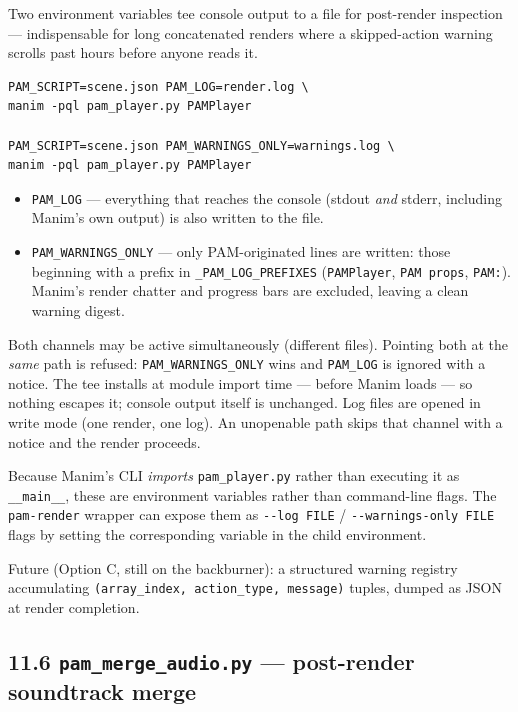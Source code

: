 \documentclass[
  12pt,
  letterpaper,
]{book}
\begin{document}
Two environment variables tee console output to a file for
post-render inspection --- indispensable for long concatenated
renders where a skipped-action warning scrolls past hours before
anyone reads it.

\begin{verbatim}
PAM_SCRIPT=scene.json PAM_LOG=render.log \
manim -pql pam_player.py PAMPlayer

PAM_SCRIPT=scene.json PAM_WARNINGS_ONLY=warnings.log \
manim -pql pam_player.py PAMPlayer
\end{verbatim}

\begin{itemize}
\item
  \texttt{PAM\_LOG} --- everything that reaches the console (stdout
  \emph{and} stderr, including Manim's own output) is also written to
  the file.
\item
  \texttt{PAM\_WARNINGS\_ONLY} --- only PAM-originated lines are
  written: those beginning with a prefix in
  \texttt{\_PAM\_LOG\_PREFIXES} (\texttt{PAMPlayer},
  \texttt{PAM\ props}, \texttt{PAM:}). Manim's render chatter and
  progress bars are excluded, leaving a clean warning digest.
\end{itemize}

Both channels may be active simultaneously (different files). Pointing
both at the \emph{same} path is refused: \texttt{PAM\_WARNINGS\_ONLY}
wins and \texttt{PAM\_LOG} is ignored with a notice. The tee installs
at module import time --- before Manim loads --- so nothing escapes
it; console output itself is unchanged. Log files are opened in write
mode (one render, one log). An unopenable path skips that channel with
a notice and the render proceeds.

Because Manim's CLI \emph{imports} \texttt{pam\_player.py} rather than
executing it as \texttt{\_\_main\_\_}, these are environment variables
rather than command-line flags. The \texttt{pam-render} wrapper can
expose them as \texttt{-{}-log\ FILE} / \texttt{-{}-warnings-only\ FILE}
flags by setting the corresponding variable in the child environment.

Future (Option C, still on the backburner): a structured warning
registry accumulating \texttt{(array\_index,\ action\_type,\ message)}
tuples, dumped as JSON at render completion.

\subsection{\texorpdfstring{11.6 \texttt{pam\_merge\_audio.py} ---
post-render soundtrack
merge}{11.6 pam\_merge\_audio.py --- post-render soundtrack merge}}\label{pam-merge-audio}
\end{document}

